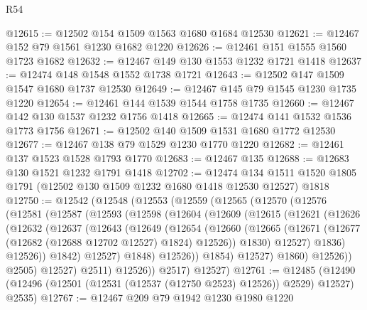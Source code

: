 \begin{lexlean}{R54}
\begin{coremodule}
@12615 := @12502 @154 @1509 @1563 @1680 @1684 @12530
@12621 := @12467 @152 @79 @1561 @1230 @1682 @1220
@12626 := @12461 @151 @1555 @1560 @1723 @1682
@12632 := @12467 @149 @130 @1553 @1232 @1721 @1418
@12637 := @12474 @148 @1548 @1552 @1738 @1721
@12643 := @12502 @147 @1509 @1547 @1680 @1737 @12530
@12649 := @12467 @145 @79 @1545 @1230 @1735 @1220
@12654 := @12461 @144 @1539 @1544 @1758 @1735
@12660 := @12467 @142 @130 @1537 @1232 @1756 @1418
@12665 := @12474 @141 @1532 @1536 @1773 @1756
@12671 := @12502 @140 @1509 @1531 @1680 @1772 @12530
@12677 := @12467 @138 @79 @1529 @1230 @1770 @1220
@12682 := @12461 @137 @1523 @1528 @1793 @1770
@12683 := @12467 @135
@12688 := @12683 @130 @1521 @1232 @1791 @1418
@12702 := @12474
    @134
    @1511
    @1520
    @1805
    @1791
    (@12502 @130 @1509 @1232 @1680 @1418 @12530 @12527)
    @1818
@12750 := @12542
    (@12548
      (@12553
        (@12559
          (@12565
            (@12570
              (@12576
                (@12581
                  (@12587
                    (@12593
                      (@12598
                        (@12604
                          (@12609
                            (@12615
                              (@12621
                                (@12626
                                  (@12632
                                    (@12637
                                      (@12643
                                        (@12649
                                          (@12654
                                            (@12660
                                              (@12665
                                                (@12671
                                                  (@12677
                                                    (@12682 (@12688 @12702 @12527) @1824)
                                                    @12526))
                                                @1830)
                                              @12527)
                                            @1836)
                                          @12526))
                                      @1842)
                                    @12527)
                                  @1848)
                                @12526))
                            @1854)
                          @12527)
                        @1860)
                      @12526))
                  @2505)
                @12527)
              @2511)
            @12526))
        @2517)
      @12527)
@12761 := @12485
    (@12490 (@12496 (@12501 (@12531 (@12537 (@12750 @2523) @12526)) @2529) @12527) @2535)
@12767 := @12467 @209 @79 @1942 @1230 @1980 @1220

\end{coremodule}
\end{lexlean}

